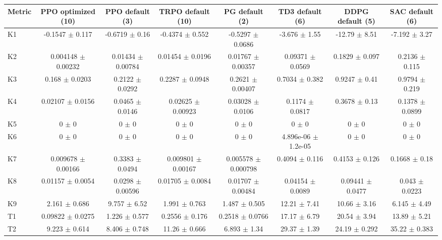 \begin{tabular}{lccccccc}
\toprule
Metric & PPO optimized (10) & PPO default (3) & TRPO default (10) & PG default (2) & TD3 default (6) & DDPG default (5) & SAC default (6) \\
\midrule
K1 & -0.1547 $\pm$ 0.117 & -0.6719 $\pm$ 0.16 & -0.4374 $\pm$ 0.552 & -0.5297 $\pm$ 0.0686 & -3.676 $\pm$ 1.55 & -12.79 $\pm$ 8.51 & -7.192 $\pm$ 3.27 \\
K2 & 0.004148 $\pm$ 0.00232 & 0.01434 $\pm$ 0.00784 & 0.01454 $\pm$ 0.0196 & 0.01767 $\pm$ 0.00357 & 0.09371 $\pm$ 0.0569 & 0.1829 $\pm$ 0.097 & 0.2136 $\pm$ 0.115 \\
K3 & 0.168 $\pm$ 0.0203 & 0.2122 $\pm$ 0.0292 & 0.2287 $\pm$ 0.0948 & 0.2621 $\pm$ 0.00407 & 0.7034 $\pm$ 0.382 & 0.9247 $\pm$ 0.41 & 0.9794 $\pm$ 0.219 \\
K4 & 0.02107 $\pm$ 0.0156 & 0.0465 $\pm$ 0.0146 & 0.02625 $\pm$ 0.00923 & 0.03028 $\pm$ 0.0106 & 0.1174 $\pm$ 0.0817 & 0.3678 $\pm$ 0.13 & 0.1378 $\pm$ 0.0899 \\
K5 & 0 $\pm$ 0 & 0 $\pm$ 0 & 0 $\pm$ 0 & 0 $\pm$ 0 & 0 $\pm$ 0 & 0 $\pm$ 0 & 0 $\pm$ 0 \\
K6 & 0 $\pm$ 0 & 0 $\pm$ 0 & 0 $\pm$ 0 & 0 $\pm$ 0 & 4.896e-06 $\pm$ 1.2e-05 & 0 $\pm$ 0 & 0 $\pm$ 0 \\
K7 & 0.009678 $\pm$ 0.00166 & 0.3383 $\pm$ 0.0494 & 0.009801 $\pm$ 0.00167 & 0.005578 $\pm$ 0.000798 & 0.4094 $\pm$ 0.116 & 0.4153 $\pm$ 0.126 & 0.1668 $\pm$ 0.18 \\
K8 & 0.01157 $\pm$ 0.0054 & 0.0298 $\pm$ 0.00596 & 0.01705 $\pm$ 0.0084 & 0.01707 $\pm$ 0.00484 & 0.04154 $\pm$ 0.0089 & 0.09441 $\pm$ 0.0477 & 0.043 $\pm$ 0.0223 \\
K9 & 2.161 $\pm$ 0.686 & 9.757 $\pm$ 6.52 & 1.991 $\pm$ 0.763 & 1.487 $\pm$ 0.505 & 12.21 $\pm$ 7.41 & 10.66 $\pm$ 3.16 & 6.145 $\pm$ 4.49 \\
T1 & 0.09822 $\pm$ 0.0275 & 1.226 $\pm$ 0.577 & 0.2556 $\pm$ 0.176 & 0.2518 $\pm$ 0.0766 & 17.17 $\pm$ 6.79 & 20.54 $\pm$ 3.94 & 13.89 $\pm$ 5.21 \\
T2 & 9.223 $\pm$ 0.614 & 8.406 $\pm$ 0.748 & 11.26 $\pm$ 0.666 & 6.893 $\pm$ 1.34 & 29.37 $\pm$ 1.39 & 24.19 $\pm$ 0.292 & 35.22 $\pm$ 0.383 \\
\bottomrule
\end{tabular}
